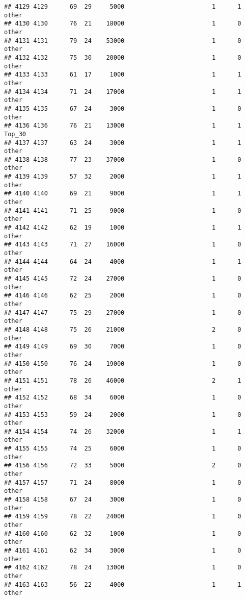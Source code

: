 \documentclass[
]{article}
\begin{document}
\begin{verbatim}
## 4129 4129      69  29     5000                        1      1    other
## 4130 4130      76  21    18000                        1      0    other
## 4131 4131      79  24    53000                        1      0    other
## 4132 4132      75  30    20000                        1      0    other
## 4133 4133      61  17     1000                        1      1    other
## 4134 4134      71  24    17000                        1      1    other
## 4135 4135      67  24     3000                        1      0    other
## 4136 4136      76  21    13000                        1      1   Top_30
## 4137 4137      63  24     3000                        1      1    other
## 4138 4138      77  23    37000                        1      0    other
## 4139 4139      57  32     2000                        1      1    other
## 4140 4140      69  21     9000                        1      1    other
## 4141 4141      71  25     9000                        1      0    other
## 4142 4142      62  19     1000                        1      1    other
## 4143 4143      71  27    16000                        1      0    other
## 4144 4144      64  24     4000                        1      1    other
## 4145 4145      72  24    27000                        1      0    other
## 4146 4146      62  25     2000                        1      0    other
## 4147 4147      75  29    27000                        1      0    other
## 4148 4148      75  26    21000                        2      0    other
## 4149 4149      69  30     7000                        1      0    other
## 4150 4150      76  24    19000                        1      0    other
## 4151 4151      78  26    46000                        2      1    other
## 4152 4152      68  34     6000                        1      0    other
## 4153 4153      59  24     2000                        1      0    other
## 4154 4154      74  26    32000                        1      1    other
## 4155 4155      74  25     6000                        1      0    other
## 4156 4156      72  33     5000                        2      0    other
## 4157 4157      71  24     8000                        1      0    other
## 4158 4158      67  24     3000                        1      0    other
## 4159 4159      78  22    24000                        1      0    other
## 4160 4160      62  32     1000                        1      0    other
## 4161 4161      62  34     3000                        1      0    other
## 4162 4162      78  24    13000                        1      0    other
## 4163 4163      56  22     4000                        1      1    other

\end{verbatim}
\end{document}
